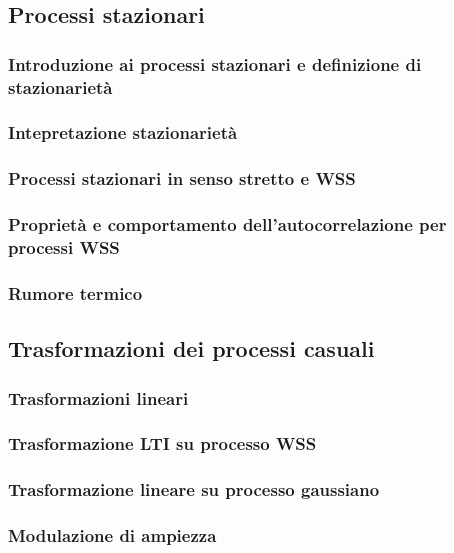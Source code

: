 \documentclass[../main.tex]{subfiles}
\begin{document}
\subsection{Processi stazionari}

\subsubsection{Introduzione ai processi stazionari e definizione di stazionarietà}

\subsubsection{Intepretazione stazionarietà}

\subsubsection{Processi stazionari in senso stretto e WSS}

\subsubsection{Proprietà e comportamento dell'autocorrelazione per processi WSS}

\subsubsection{Rumore termico}

\subsection{Trasformazioni dei processi casuali}

\subsubsection{Trasformazioni lineari}

\subsubsection{Trasformazione LTI su processo WSS}

\subsubsection{Trasformazione lineare su processo gaussiano}

\subsubsection{Modulazione di ampiezza}
\end{document}
